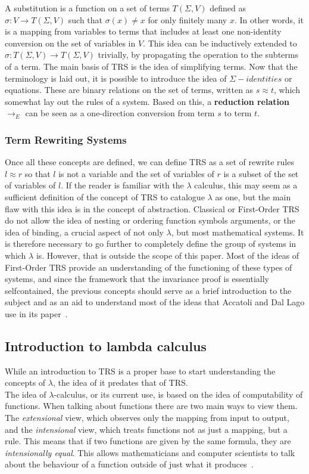 \documentclass[12pt]{article}
\begin{document}
  A substitution is a function on a set of terms $T(\Sigma , V)$ defined as $\sigma : V \rightarrow T( \Sigma , V )$ such that $\sigma (x) \neq x$ for only finitely many $x$. In other words, it is a mapping from variables to terms that includes at least one non-identity conversion on the set of variables in $V$.
  This idea can be inductively extended to $\hat \sigma : T( \Sigma , V ) \rightarrow T(\Sigma , V)$ trivially, by propagating the operation to the subterms of a term.
  The main basis of TRS is the idea of simplifying terms. Now that the terminology is laid out, it is possible to introduce the idea of $\Sigma -identities$ or equations. These are binary relations on the set of terms, written as $s \approx t$, which somewhat lay out the rules of a system. Based on this, a \textbf{reduction relation} $\rightarrow_{E}$ can be seen as a one-direction conversion from term $s$ to term $t$.
  \subsubsection{Term Rewriting Systems}
  Once all these concepts are defined, we can define TRS as a set of rewrite rules $l \approx r$ so that $l$ is not a variable and the set of variables of $r$ is a subset of the set of variables of $l$.
  If the reader is familiar with the $\lambda$ calculus, this may seem as a sufficient definition of the concept of TRS to catalogue $\lambda$ as one, but the main flaw with this idea is in the concept of abstraction. Classical or First-Order TRS do not allow the idea of nesting or ordering function symbols arguments, or the idea of binding, a crucial aspect of not only $\lambda$, but most mathematical systems. It is therefore necessary to go further to completely define the group of systems in which $\lambda$ is. However, that is outside the scope of this paper. Most of the ideas of First-Order TRS provide an understanding of the functioning of these types of systems, and since the framework that the invariance proof is essentially selfcontained, the previous concepts should serve as a brief introduction to the subject and as an aid to understand most of the ideas that Accatoli and Dal Lago use in its paper~\cite{beta-invariance}.

  \subsection{Introduction to lambda calculus}\label{intro-lambda}
  While an introduction to TRS is a proper base to start understanding the concepts of $\lambda$, the idea of it predates that of TRS. \\
The idea of $\lambda$-calculus, or its current use, is based on the idea of computability of functions. When talking about functions there are two main ways to view them. The \textit{extensional} view, which observes only the mapping from input to output, and the \textit{intensional} view, which treats functions not as just a mapping, but a rule. This means that if two functions are given by the same formula, they are \textit{intensionally equal}. This allows mathematicians and computer scientists to talk about the behaviour of a function outside of just what it produces~\cite{selinger}.
\end{document}

